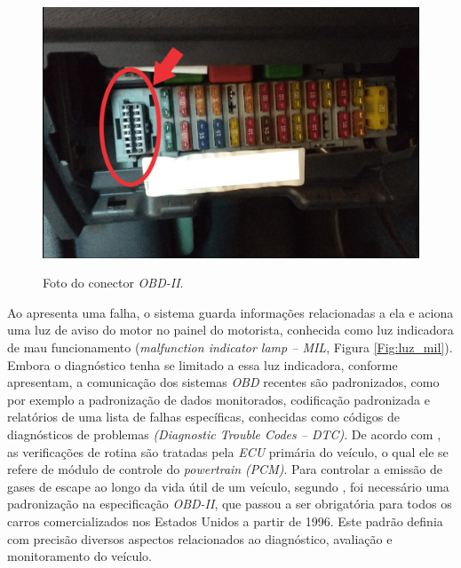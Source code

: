 \begin{figure}[!ht]
\centering
\caption{Foto do conector \textit{OBD-II}.} 
{\includegraphics[scale=.19]{imagens/obdII.png}}\\
 \label{Fig:obd2}
\end{figure}

Ao apresenta uma falha, o sistema guarda informações relacionadas a ela e aciona uma luz de aviso do motor no painel do motorista, conhecida como luz indicadora de mau funcionamento (\textit{malfunction indicator lamp – MIL}, Figura \ref{Fig:luz_mil}). Embora o diagnóstico tenha se limitado a essa luz indicadora, conforme  apresentam, a comunicação dos sistemas \textit{OBD} recentes são padronizados, como por exemplo a padronização de dados monitorados, codificação padronizada e relatórios de uma lista de falhas específicas, conhecidas como códigos de diagnósticos de problemas \textit{(Diagnostic Trouble Codes – DTC)}. De acordo com , as verificações de rotina são tratadas pela \textit{ECU} primária do veículo, o qual ele se refere de módulo de controle do \textit{powertrain} \textit{(PCM)}. Para controlar a emissão de gases de escape ao longo da vida útil de um veículo, segundo , foi necessário uma padronização na especificação \textit{OBD-II}, que passou a ser obrigatória para todos os carros comercializados nos Estados Unidos a partir de 1996. Este padrão definia com precisão diversos aspectos relacionados ao diagnóstico, avaliação e monitoramento do veículo.


